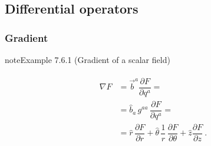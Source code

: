 \documentclass[letterpaper,10pt,english]{jupyterBook}
\begin{document}
\subsection{Differential operators}
\label{\detokenize{ch/tensor-algebra-calculus/calculus-euclidean-cylindrical:differential-operators}}\label{\detokenize{ch/tensor-algebra-calculus/calculus-euclidean-cylindrical:tensor-calculus-cylindrical-differential-operators}}

\subsubsection{Gradient}
\label{\detokenize{ch/tensor-algebra-calculus/calculus-euclidean-cylindrical:gradient}}\label{\detokenize{ch/tensor-algebra-calculus/calculus-euclidean-cylindrical:tensor-calculus-cylindrical-differential-operators-gradient}}\label{ch/tensor-algebra-calculus/calculus-euclidean-cylindrical:example-0}
\begin{sphinxadmonition}{note}{Example 7.6.1 (Gradient of a scalar field)}


\begin{equation*}
\begin{split}\begin{aligned}
  \nabla F 
  & = \vec{b}^a \dfrac{\partial F}{\partial q^a} = \\
  & = \hat{b}_a \, g^{aa} \, \dfrac{\partial F}{\partial q^a} = \\
  & = \hat{r} \, \dfrac{\partial F}{\partial  r} 
    + \hat{\theta} \, \dfrac{1}{r} \, \dfrac{\partial F}{\partial \theta}  
    + \hat{z} \dfrac{\partial F}{\partial z} \ . 
\end{aligned}\end{split}
\end{equation*}\end{sphinxadmonition}
\label{ch/tensor-algebra-calculus/calculus-euclidean-cylindrical:example-1}
\end{document}
